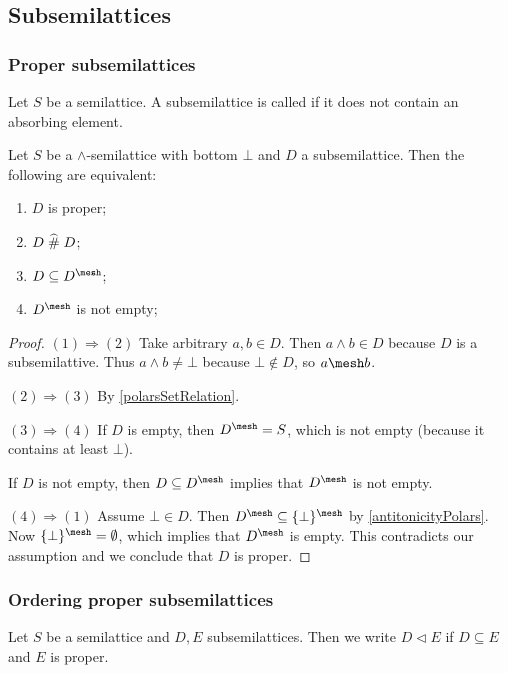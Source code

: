 \subsection{Subsemilattices}
\subsubsection{Proper subsemilattices}
\begin{definition}
Let $S$ be a semilattice. A subsemilattice is called  if it does not contain an absorbing element.
\end{definition}

\begin{lemma} \label{properSubsemilatticeLemma}
Let $S$ be a $\wedge$-semilattice with bottom $\bot$ and $D$ a subsemilattice. Then the following are equivalent:
\begin{enumerate}
\item $D$ is proper;
\item $D\mathrel{\widehat{\#}} D$;
\item $D\subseteq D^\mesh$;
\item $D^\mesh$ is not empty;
\end{enumerate}
\end{lemma}
\begin{proof}
$(1) \Rightarrow (2)$ Take arbitrary $a,b\in D$. Then $a\wedge b\in D$ because $D$ is a subsemilattive. Thus $a\wedge b \neq \bot$ because $\bot\notin D$, so $a\mesh b$.

$(2) \Rightarrow (3)$ By \ref{polarsSetRelation}.

$(3) \Rightarrow (4)$ If $D$ is empty, then $D^\mesh = S$, which is not empty (because it contains at least $\bot$). 

If $D$ is not empty, then $D\subseteq D^\mesh$ implies that $D^\mesh$ is not empty.

$(4) \Rightarrow (1)$ Assume $\bot\in D$. Then $D^\mesh \subseteq \{\bot\}^\mesh$ by \ref{antitonicityPolars}. Now $\{\bot\}^\mesh = \emptyset$, which implies that $D^\mesh$ is empty. This contradicts our assumption and we conclude that $D$ is proper.
\end{proof}

\subsubsection{Ordering proper subsemilattices}
\begin{definition}
Let $S$ be a semilattice and $D,E$ subsemilattices. Then we write $D\lhd E$ if $D\subseteq E$ and $E$ is proper.
\end{definition}

